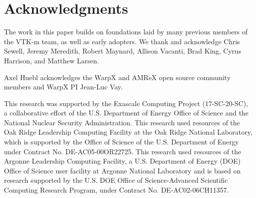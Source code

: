\section{Acknowledgments}


The work in this paper builds on foundations laid by many previous members of the VTK-m team, as well as early adopters.  We thank and acknowledge
Chris Sewell, Jeremy Meredith, Robert Maynard, Allison Vacanti, Brad King, Cyrus Harrison, and Matthew Larsen.

Axel Huebl acknowledges the WarpX and AMReX open source community members and WarpX PI Jean-Luc Vay.

This research was supported by the Exascale Computing Project (17-SC-20-SC), a collaborative effort of the U.S. Department of Energy Office of Science and the National Nuclear Security Administration.
This research used resources of the Oak Ridge Leadership Computing Facility at the Oak Ridge National Laboratory, which is supported by the Office of Science of the U.S. Department of Energy under Contract No. DE-AC05-00OR22725.
This research used resources of the Argonne Leadership Computing Facility, a U.S. Department of Energy (DOE) Office of Science user facility at Argonne National Laboratory and is based on research supported by the U.S. DOE Office of Science-Advanced Scientific Computing Research Program, under Contract No. DE-AC02-06CH11357.
